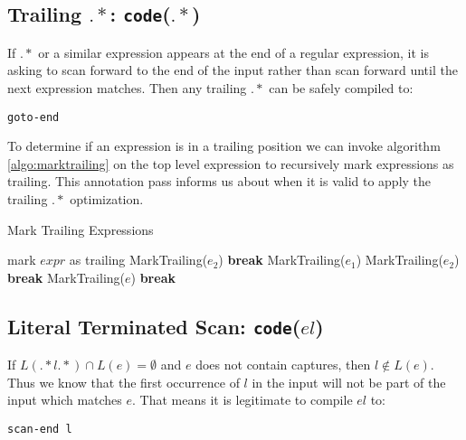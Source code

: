 \subsection{Trailing $.*$: {\tt code}($.*$) }

If $.*$ or a similar expression appears at the end of a regular expression,
it is asking to scan forward to the end of the input rather than scan
forward until the next expression matches. Then any trailing $.*$ can
be safely compiled to:

\begin{verbatim}
goto-end
\end{verbatim}

To determine if an expression is in a trailing position we can 
invoke algorithm \ref{algo:marktrailing} on the top level expression
to recursively mark expressions as trailing. This annotation pass
informs us about when it is valid to apply the trailing $.*$ optimization.

\begin{algorithm}
\caption{Mark Trailing Expressions} \label{algo:marktrailing}
\begin{algorithmic}
  \State mark $expr$ as trailing
      \State MarkTrailing($e_2$)
      \State \textbf{break}
    \EndCase
      \State MarkTrailing($e_1$)
      \State MarkTrailing($e_2$)
      \State \textbf{break}
    \EndCase
    \EndCase
    \EndCase
    \EndCase
    \EndCase
      \State MarkTrailing($e$)
      \State \textbf{break}
    \EndCase
    \Case{$\epsilon$}
    \EndCase
    \Case{$\alpha$}
    \EndCase
    \EndCase
  \EndSwitch
\EndProcedure
\end{algorithmic}
\end{algorithm}

\subsection{Literal Terminated Scan: {\tt code}($el$) }

If $L(.*l.*) \cap L(e) = \emptyset$ and $e$ does not contain captures,
then $l \not\in L(e)$. Thus we know that the first occurrence of $l$
in the input will not be part of the input which matches $e$. That means
it is legitimate to compile $el$ to:

\begin{verbatim}
scan-end l
\end{verbatim}

